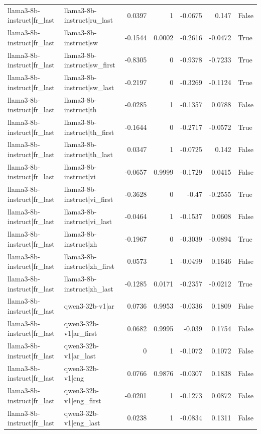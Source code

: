 \begin{table}
\begin{tabular}{l l r r r r l}
llama3-8b-instruct|fr_last & llama3-8b-instruct|ru_last & 0.0397 & 1 & -0.0675 & 0.147 & False \\
llama3-8b-instruct|fr_last & llama3-8b-instruct|sw & -0.1544 & 0.0002 & -0.2616 & -0.0472 & True \\
llama3-8b-instruct|fr_last & llama3-8b-instruct|sw_first & -0.8305 & 0 & -0.9378 & -0.7233 & True \\
llama3-8b-instruct|fr_last & llama3-8b-instruct|sw_last & -0.2197 & 0 & -0.3269 & -0.1124 & True \\
llama3-8b-instruct|fr_last & llama3-8b-instruct|th & -0.0285 & 1 & -0.1357 & 0.0788 & False \\
llama3-8b-instruct|fr_last & llama3-8b-instruct|th_first & -0.1644 & 0 & -0.2717 & -0.0572 & True \\
llama3-8b-instruct|fr_last & llama3-8b-instruct|th_last & 0.0347 & 1 & -0.0725 & 0.142 & False \\
llama3-8b-instruct|fr_last & llama3-8b-instruct|vi & -0.0657 & 0.9999 & -0.1729 & 0.0415 & False \\
llama3-8b-instruct|fr_last & llama3-8b-instruct|vi_first & -0.3628 & 0 & -0.47 & -0.2555 & True \\
llama3-8b-instruct|fr_last & llama3-8b-instruct|vi_last & -0.0464 & 1 & -0.1537 & 0.0608 & False \\
llama3-8b-instruct|fr_last & llama3-8b-instruct|zh & -0.1967 & 0 & -0.3039 & -0.0894 & True \\
llama3-8b-instruct|fr_last & llama3-8b-instruct|zh_first & 0.0573 & 1 & -0.0499 & 0.1646 & False \\
llama3-8b-instruct|fr_last & llama3-8b-instruct|zh_last & -0.1285 & 0.0171 & -0.2357 & -0.0212 & True \\
llama3-8b-instruct|fr_last & qwen3-32b-v1|ar & 0.0736 & 0.9953 & -0.0336 & 0.1809 & False \\
llama3-8b-instruct|fr_last & qwen3-32b-v1|ar_first & 0.0682 & 0.9995 & -0.039 & 0.1754 & False \\
llama3-8b-instruct|fr_last & qwen3-32b-v1|ar_last & 0 & 1 & -0.1072 & 0.1072 & False \\
llama3-8b-instruct|fr_last & qwen3-32b-v1|eng & 0.0766 & 0.9876 & -0.0307 & 0.1838 & False \\
llama3-8b-instruct|fr_last & qwen3-32b-v1|eng_first & -0.0201 & 1 & -0.1273 & 0.0872 & False \\
llama3-8b-instruct|fr_last & qwen3-32b-v1|eng_last & 0.0238 & 1 & -0.0834 & 0.1311 & False \\

\end{tabular}
\end{table}

